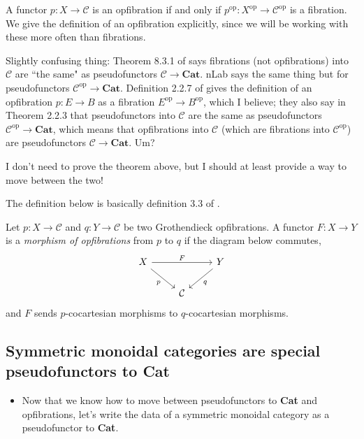 \documentclass{MetricNotes2023}
\begin{document}
\begin{remark}
A functor \(p : X \to \mathcal{C}\) is an opfibration if and only if \(p^{\text{op}} : X^{\text{op}}\to \mathcal{C}^{\text{op}}\) is a fibration. We give the definition of an opfibration explicitly, since we will be working with these more often than fibrations.  
\end{remark}

Slightly confusing thing: Theorem 8.3.1 of \autocite{categorical} says fibrations (not opfibrations) into \(\mathcal{C}\) are ``the same" as pseudofunctors \(\mathcal{C} \to \textbf{Cat}\). nLab says the same thing but for pseudofunctors \(\mathcal{C}^{\text{op}}\to \textbf{Cat}\). Definition 2.2.7 of \autocite{fibrational_notions} gives the definition of an opfibration \(p : E \to B\) as a fibration \(E^{\text{op}}\to B^{\text{op}}\), which I believe; they also say in Theorem 2.2.3 that pseudofunctors into \(\mathcal{C}\) are the same as pseudofunctors \(\mathcal{C}^{\text{op}}\to \textbf{Cat}\), which means that opfibrations into \(\mathcal{C}\) (which are fibrations into \(\mathcal{C}^{\text{op}}\)) are pseudofunctors \(\mathcal{C} \to \textbf{Cat}\). Um? 

I don't need to prove the theorem above, but I should at least provide a way to move between the two!

The definition below is basically definition 3.3 of \autocite{symmetricmonoidal}.

\begin{definition}
Let \(p : X \to \mathcal{C}\) and \(q : Y \to \mathcal{C}\) be two Grothendieck opfibrations. A functor \(F : X \to Y\) is a \textit{morphism of opfibrations} from \(p\) to \(q\) if the diagram below commutes,
\[\begin{tikzcd}
X \arrow[rd, swap, "p"] \arrow[rr, "F"]  & & Y \arrow[ld, "q"]  \\
& \mathcal{C}  & 
\end{tikzcd}\]
and \(F\) sends \(p\)-cocartesian morphisms to \(q\)-cocartesian morphisms. 
\end{definition}

\subsection{Symmetric monoidal categories are special pseudofunctors to \textbf{Cat}}

\begin{itemize}
\item Now that we know how to move between pseudofunctors to \textbf{Cat} and opfibrations, let's write the data of a symmetric monoidal category as a pseudofunctor to \textbf{Cat}.
\end{itemize}
\end{document}

